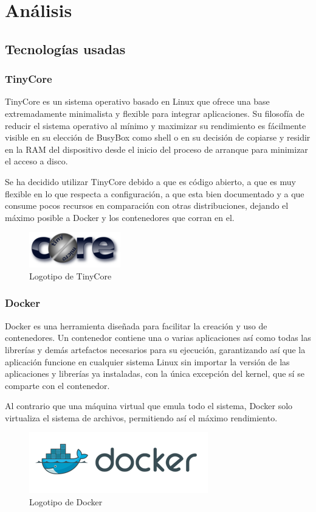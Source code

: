 \documentclass{tfg}
\begin{document}
\chapter{Análisis}
\section{Tecnologías usadas}
\subsection{TinyCore}
TinyCore es un sistema operativo basado en Linux que ofrece una base extremadamente minimalista y flexible para
integrar aplicaciones. Su filosofía de reducir el sistema operativo al mínimo y maximizar su rendimiento es
fácilmente visible en su elección de BusyBox como shell o en su decisión de copiarse y residir en la RAM del dispositivo
desde el inicio del proceso de arranque para minimizar el acceso a disco. \cite{tinycore}

Se ha decidido utilizar TinyCore debido a que es código abierto, a que es muy flexible en lo que respecta a configuración,
a que esta bien documentado y a que consume pocos recursos en comparación con otras distribuciones, dejando el máximo posible
a Docker y los contenedores que corran en el.
\begin{figure}[hb]
	\centering
	\includegraphics[scale=0.8]{images/tinycore_logo}
	\caption{Logotipo de TinyCore}
\end{figure}


\subsection{Docker}
Docker es una herramienta diseñada para facilitar la creación y uso de contenedores. Un contenedor contiene una o varias
aplicaciones así como todas las librerías y demás artefactos necesarios para su ejecución, garantizando así que la
aplicación funcione en cualquier sistema Linux sin importar la versión de las aplicaciones y librerías ya instaladas, con la única
excepción del kernel, que sí se comparte con el contenedor. \cite{docker}
\\\par
Al contrario que una máquina virtual que emula todo el sistema, Docker solo virtualiza el sistema de archivos,
permitiendo así el máximo rendimiento.
\begin{figure}[hb]
	\centering
	\includegraphics[scale=0.75]{images/docker_logo}
	\caption{Logotipo de Docker}
\end{figure}
\end{document}
